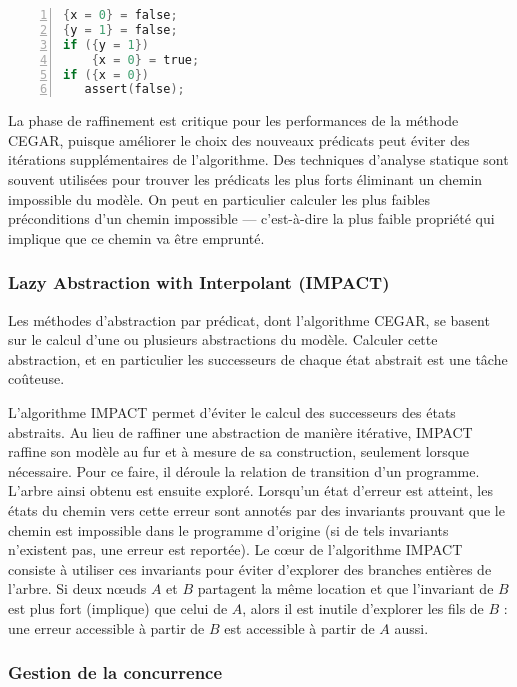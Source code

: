 \begin{minipage}{.45\textwidth}
\begin{lstlisting}[language=C, label=lst:CEGAR_3, numbers=left, frame=single,
  caption=Second raffinement]
{x = 0} = false;
{y = 1} = false;
if ({y = 1})
    {x = 0} = true;
if ({x = 0})
   assert(false);
\end{lstlisting}
\end{minipage}

La phase de raffinement est critique pour les performances de la méthode
\ac{CEGAR}, puisque améliorer le choix des nouveaux prédicats peut éviter des
itérations supplémentaires de l'algorithme. Des techniques d'analyse statique
sont souvent utilisées pour trouver les prédicats les plus forts éliminant un
chemin impossible du modèle. On peut en particulier calculer les plus faibles
préconditions d'un chemin impossible --- c'est-à-dire la plus faible propriété
qui implique que ce chemin va être emprunté.

\subsubsection{Lazy Abstraction with Interpolant (IMPACT)}

Les méthodes d'abstraction par prédicat, dont l'algorithme \ac{CEGAR}, se basent sur
le calcul d'une ou plusieurs abstractions du modèle. Calculer cette abstraction,
et en particulier les successeurs de chaque état abstrait est une tâche
coûteuse.

L'algorithme IMPACT\cite{IMPACT} permet d'éviter le calcul des successeurs des
états abstraits. Au lieu de raffiner une abstraction de manière itérative,
IMPACT raffine son modèle au fur et à mesure de sa construction, seulement
lorsque nécessaire. Pour ce faire, il déroule la relation de transition d'un
programme. L'arbre ainsi obtenu est ensuite exploré. Lorsqu'un état d'erreur
est atteint, les états du chemin vers cette erreur sont annotés par des invariants
prouvant que le chemin est impossible dans le programme d'origine (si de tels
invariants n'existent pas, une erreur est reportée). Le cœur de l'algorithme
IMPACT consiste à utiliser ces invariants pour éviter d'explorer des branches
entières de l'arbre. Si deux nœuds \(A\) et \(B\) partagent la même location et
que l'invariant de \(B\) est plus fort (implique) que celui de \(A\), alors il
est inutile d'explorer les fils de \(B\) : une erreur accessible à partir de
\(B\) est accessible à partir de \(A\) aussi.

\subsubsection{Gestion de la concurrence}

